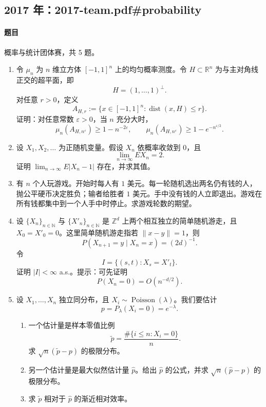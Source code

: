 \documentclass[UTF8,12pt]{ctexart}
\begin{document}
\subsection{2017 年：2017-team.pdf\#probability}
\paragraph{题目}
概率与统计团体赛，共 5 题。
\begin{enumerate}[label=\textbf{\arabic*.},leftmargin=2.2em]
\item 令 \(\mu_n\) 为 \(n\) 维立方体 \([-1,1]^n\) 上的均匀概率测度。令 \(H\subset\mathbb R^n\) 为与主对角线正交的超平面，即
\[
H=(1,\ldots,1)^\perp.
\]
对任意 \(r>0\)，定义
\[
A_{H,r}:=\{x\in[-1,1]^n:\operatorname{dist}(x,H)\le r\}.
\]
证明：对任意常数 \(\varepsilon>0\)，当 \(n\) 充分大时，
\[
\mu_n(A_{H,n^\varepsilon})\ge 1-n^{-2\varepsilon},
\qquad
\mu_n(A_{H,n^\varepsilon})\ge 1-e^{-n^{\varepsilon/2}}.
\]

\item 设 \(X_1,X_2,\ldots\) 为正随机变量。假设 \(X_n\) 依概率收敛到 \(0\)，且
\[
\lim_{n\to\infty}E X_n=2.
\]
证明 \(\lim_{n\to\infty}E|X_n-1|\) 存在，并求其值。

\item 有 \(n\) 个人玩游戏。开始时每人有 \(1\) 美元。每一轮随机选出两名仍有钱的人，抛公平硬币决定胜负；输者给胜者 \(1\) 美元。手中没有钱的人立即退出。游戏在所有钱都集中到一个人手中时停止。求游戏轮数的期望。

\item 设 \(\{X_n\}_{n\in\mathbb N}\) 与 \(\{X'_n\}_{n\in\mathbb N}\) 是 \(\mathbb Z^d\) 上两个相互独立的简单随机游走，且 \(X_0=X'_0=0\)。这里简单随机游走指若 \(\|x-y\|=1\)，则
\[
P(X_{n+1}=y\mid X_n=x)=(2d)^{-1}.
\]
令
\[
I=\{(s,t):X_s=X'_t\}.
\]
证明 \(|I|<\infty\) a.s.。提示：可先证明
\[
P(X_n=0)=O(n^{-d/2}).
\]

\item 设 \(X_1,\ldots,X_n\) 独立同分布，且 \(X_i\sim\operatorname{Poisson}(\lambda)\)。我们要估计
\[
p=P_\lambda(X_i=0)=e^{-\lambda}.
\]
\begin{enumerate}[label=\textbf{(\alph*)},leftmargin=2.4em]
\item 一个估计量是样本零值比例
\[
\widetilde p=\frac{\#\{i\le n:X_i=0\}}{n}.
\]
求 \(\sqrt n(\widetilde p-p)\) 的极限分布。
\item 另一个估计量是最大似然估计量 \(\widehat p\)。给出 \(\widehat p\) 的公式，并求 \(\sqrt n(\widehat p-p)\) 的极限分布。
\item 求 \(\widetilde p\) 相对于 \(\widehat p\) 的渐近相对效率。
\end{enumerate}
\end{enumerate}
\end{document}
